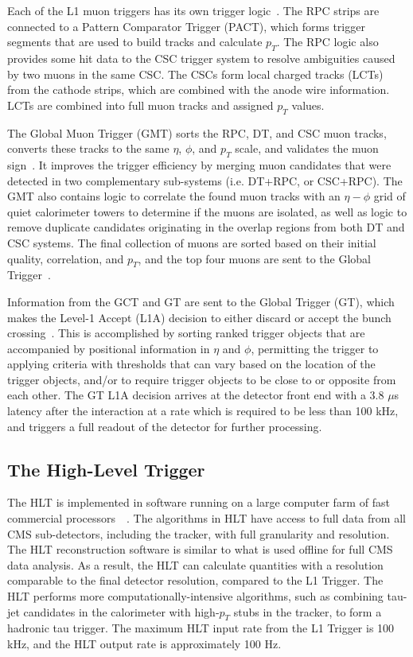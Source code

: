 Each of the L1 muon triggers has its own trigger logic~\cite{CERN-LHCC-2000-038}. The RPC strips are connected to a Pattern Comparator Trigger (PACT), which forms trigger segments that are used to build tracks and calculate $p_{T}$. The RPC logic also provides some hit data to the CSC trigger system to resolve ambiguities caused by two muons in the same CSC. The CSCs form local charged tracks (LCTs) from the cathode strips, which are combined with the anode wire information. LCTs are combined into full muon tracks and assigned $p_{T}$ values. 

The Global Muon Trigger (GMT) sorts the RPC, DT, and CSC muon tracks, converts these tracks to the same $\eta$, $\phi$, and $p_{T}$ scale, and validates the muon sign~\cite{CERN-LHCC-2000-038}. It improves the trigger efficiency by merging muon candidates that were detected in two complementary sub-systems (i.e. DT+RPC, or CSC+RPC). The GMT also contains logic to correlate the found muon tracks with an $\eta-\phi$ grid of quiet calorimeter towers to determine if the muons are isolated, as well as logic to remove duplicate candidates originating in the overlap regions from both DT and CSC systems. The final collection of muons are sorted based on their initial quality, correlation, and $p_{T}$, and the top four muons are sent to the Global Trigger~\cite{CERN-LHCC-2000-038}. 

Information from the GCT and GT are sent to the Global Trigger (GT), which makes the Level-1 Accept (L1A) decision to either discard or accept the bunch crossing~\cite{CERN-LHCC-2000-038}. This is accomplished by sorting ranked trigger objects that are accompanied by positional information in $\eta$ and $\phi$, permitting the trigger to applying criteria with thresholds that can vary based on the location of the trigger objects, and/or to require trigger objects to be close to or opposite from each other. The GT L1A decision arrives at the detector front end with a 3.8 $\mu$s latency after the interaction at a rate which is required to be less than 100 kHz, and triggers a full readout of the detector for further processing.



\subsection{The High-Level Trigger}
\label{section:phase-1-high-level-trigger}
The HLT is implemented in software running on a large computer farm of fast commercial processors~\cite{CMS-TDR-022-HLT}~\cite{Foudas:2008dt}. The algorithms in HLT have access to full data from all CMS sub-detectors, including the tracker, with full granularity and resolution. The HLT reconstruction software is similar to what is used offline for full CMS data analysis. As a result, the HLT can calculate quantities with a resolution comparable to the final detector resolution, compared to the L1 Trigger. The HLT performs more computationally-intensive algorithms, such as combining tau-jet candidates in the calorimeter with high-$p_T$ stubs in the tracker, to form a hadronic tau trigger. The maximum HLT input rate from the L1 Trigger is 100 kHz, and the HLT output rate is approximately 100 Hz. 

